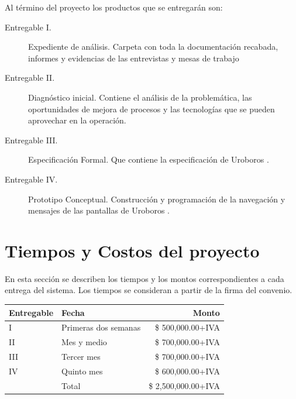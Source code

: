 \documentclass[10pt]{book}
\newcommand{\nombreProyecto}{Uroboros }
\begin{document}
	Al término del proyecto los productos que se entregarán son:
	
\begin{description}
	\item [Entregable I.] Expediente de análisis. Carpeta con toda la documentación recabada, informes y evidencias de las entrevistas y mesas de trabajo
	\item [Entregable II.] Diagnóstico inicial. Contiene el análisis de la problemática, las oportunidades de mejora de procesos y las tecnologías que se pueden aprovechar en la operación.
	\item [Entregable III.] Especificación Formal. Que contiene la especificación de \nombreProyecto.
	\item [Entregable IV.] Prototipo Conceptual. Construcción y programación de la navegación y mensajes de las pantallas de \nombreProyecto.
\end{description}


\section{Tiempos y Costos del proyecto}

	En esta sección se describen los tiempos y los montos correspondientes a cada entrega del sistema. Los  tiempos se consideran a partir de la firma del convenio.\\

\begin{tabular}{|l | l | r|}
	\hline
	{\bf Entregable}& {\bf Fecha} &{\bf Monto}  \\
	\hline
	I & Primeras dos semanas  & \$ 500,000.00+IVA\\
	\hline
	II & Mes y medio & \$ 700,000.00+IVA\\
	\hline
	III & Tercer mes & \$ 700,000.00+IVA\\
	\hline
	IV & Quinto mes & \$ 600,000.00+IVA\\
	\hline
	\hline
	 & Total & \$ 2,500,000.00+IVA\\
	\hline
\end{tabular}

\clossing
\end{document}

